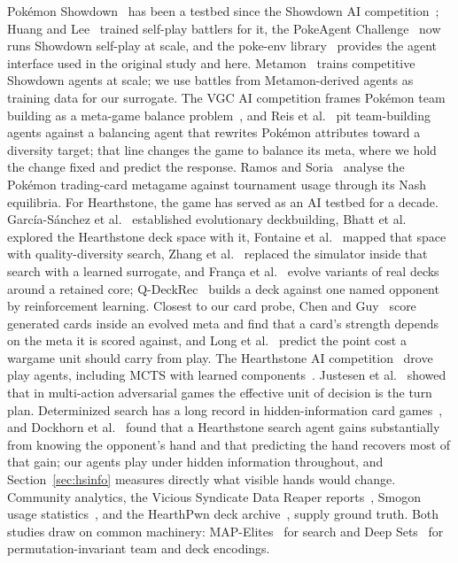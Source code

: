 \documentclass[journal]{IEEEtran}
\newcommand{\pkmn}{Pok\'emon}
\begin{document}
\pkmn{} Showdown~\cite{showdown} has been a testbed since the
Showdown AI competition~\cite{lee2017showdown}; Huang and
Lee~\cite{huang2019selfplay} trained self-play battlers for it, the
PokeAgent Challenge~\cite{karten2026pokeagent} now runs Showdown self-play
at scale, and the poke-env library~\cite{sahovic2019pokeenv} provides the
agent interface used in the original study and here.
Metamon~\cite{metamon} trains competitive Showdown agents at scale; we use
battles from Metamon-derived agents as training data for our surrogate.
The VGC AI competition frames \pkmn{} team building as a meta-game balance
problem~\cite{reis2021vgc,reis2025vgc}, and Reis et
al.~\cite{reis2024adversarial} pit team-building agents against a balancing
agent that rewrites \pkmn{} attributes toward a diversity target; that
line changes the game to balance its meta, where we hold the change fixed
and predict the response. Ramos and Soria~\cite{ramos2026nash} analyse the
\pkmn{} trading-card metagame against tournament usage through its Nash
equilibria. For Hearthstone, the
game has served as an AI testbed for a decade. Garc\'ia-S\'anchez et
al.~\cite{garcia2016evodeck} established evolutionary deckbuilding, Bhatt
et al.~\cite{bhatt2018exploring} explored the Hearthstone deck space with
it, Fontaine et al.~\cite{fontaine2019mapelites} mapped that space with
quality-diversity search, Zhang et al.~\cite{zhang2022surrogate} replaced
the simulator inside that search with a learned surrogate, and
Fran\c{c}a et al.~\cite{franca2024creativestone} evolve variants of real
decks around a retained core; Q-DeckRec~\cite{chen2018qdeckrec} builds a
deck against one named opponent by reinforcement learning. Closest to our
card probe, Chen and Guy~\cite{chen2020chaos} score generated cards inside
an evolved meta and find that a card's strength depends on the meta it is
scored against, and Long et al.~\cite{long2023pointcosts} predict the
point cost a wargame unit should carry from play. The Hearthstone AI
competition~\cite{dockhorn2019competition} drove play agents, including
MCTS with learned components~\cite{swiechowski2018}. Justesen et
al.~\cite{justesen2017} showed that in multi-action adversarial games the
effective unit of decision is the turn plan. Determinized search has a
long record in hidden-information card games~\cite{long2010pimc}, and
Dockhorn et al.~\cite{dockhorn2018prediction} found that a Hearthstone
search agent gains substantially from knowing the opponent's hand and that
predicting the hand recovers most of that gain; our agents play under
hidden information throughout, and Section~\ref{sec:hsinfo} measures
directly what visible hands would change. Community analytics, the Vicious Syndicate Data Reaper
reports~\cite{vicious_syndicate}, Smogon usage
statistics~\cite{smogonstats}, and the HearthPwn deck
archive~\cite{zenodo_dataset}, supply ground truth. Both studies draw on
common machinery: MAP-Elites~\cite{mouret2015illuminating} for search
and Deep
Sets~\cite{zaheer2017deepsets} for permutation-invariant team and deck
encodings.
\end{document}
